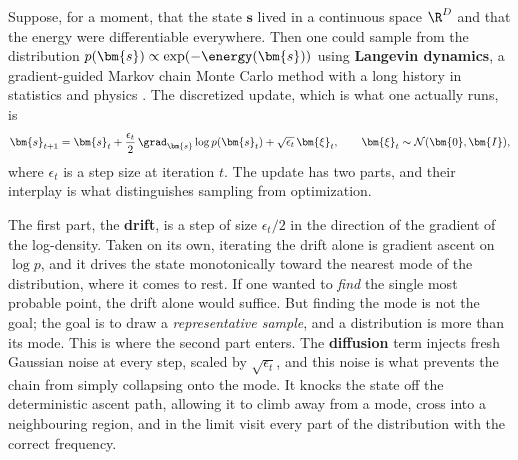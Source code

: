 Suppose, for a moment, that the state $\bm{s}$ lived in a continuous space $\R^D$ and that the energy were differentiable everywhere. Then one could sample from the distribution $p(\bm{s}) \propto \exp(-\energy(\bm{s}))$ using \textbf{Langevin dynamics}, a gradient-guided Markov chain Monte Carlo method with a long history in statistics and physics \citep{roberts1996exponential, welling2011bayesian}. The discretized update, which is what one actually runs, is
\begin{equation}
    \bm{s}_{t+1} = \bm{s}_t + \frac{\epsilon_t}{2}\,\grad_{\bm{s}} \log p(\bm{s}_t) + \sqrt{\epsilon_t}\,\bm{\xi}_t, \qquad \bm{\xi}_t \sim \mathcal{N}(\bm{0}, \bm{I}),
    \label{eq:bg-langevin}
\end{equation}
where $\epsilon_t$ is a step size at iteration $t$. The update has two parts, and their interplay is what distinguishes sampling from optimization.

The first part, the \textbf{drift}, is a step of size $\epsilon_t/2$ in the direction of the gradient of the log-density. Taken on its own, iterating the drift alone is gradient ascent on $\log p$, and it drives the state monotonically toward the nearest mode of the distribution, where it comes to rest. If one wanted to \emph{find} the single most probable point, the drift alone would suffice. But finding the mode is not the goal; the goal is to draw a \emph{representative sample}, and a distribution is more than its mode. This is where the second part enters. The \textbf{diffusion} term injects fresh Gaussian noise at every step, scaled by $\sqrt{\epsilon_t}$, and this noise is what prevents the chain from simply collapsing onto the mode. It knocks the state off the deterministic ascent path, allowing it to climb away from a mode, cross into a neighbouring region, and in the limit visit every part of the distribution with the correct frequency.

